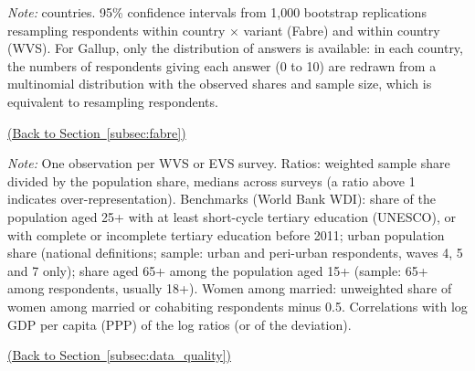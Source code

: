 \documentclass[11pt]{article}
\providecommand{\backlink}[2]{\if\relax\detokenize{#2}\relax\else\hfill\hyperref[#2]{(Back to Section~\ref*{#2})}\fi}
\begin{document}
\begin{table}[p]
    \centering
    \caption{Decomposition of the WVS--Gallup gap: summary.}\label{tab:decomposition_summary}
    \begin{adjustbox}{max width=\textwidth}
    
    \end{adjustbox}
    \begin{minipage}{\textwidth}\footnotesize \textit{Note:} \nDecompCountries countries. 95\% confidence intervals from 1,000 bootstrap replications resampling respondents within country $\times$ variant (Fabre) and within country (WVS). For Gallup, only the distribution of answers is available: in each country, the numbers of respondents giving each answer (0 to 10) are redrawn from a multinomial distribution with the observed shares and sample size, which is equivalent to resampling respondents.\end{minipage}
    {\footnotesize\backlink{tab:decomposition_summary}{subsec:fabre}\par}
\end{table}

\begin{table}[p]
    \centering
    \caption{Representativeness of WVS/EVS samples: sample shares relative to population benchmarks.}\label{tab:representativeness}
    \begin{adjustbox}{max width=\textwidth}
    
    \end{adjustbox}
    \begin{minipage}{\textwidth}\footnotesize \textit{Note:} One observation per WVS or EVS survey. Ratios: weighted sample share divided by the population share, medians across surveys (a ratio above 1 indicates over-representation). Benchmarks (World Bank WDI): share of the population aged 25+ with at least short-cycle tertiary education (UNESCO), or with complete or incomplete tertiary education \citep{barro_new_2013} before 2011; urban population share (national definitions; sample: urban and peri-urban respondents, waves 4, 5 and 7 only); share aged 65+ among the population aged 15+ (sample: 65+ among respondents, usually 18+). Women among married: unweighted share of women among married or cohabiting respondents minus 0.5. Correlations with log GDP per capita (PPP) of the log ratios (or of the deviation).\end{minipage}
    {\footnotesize\backlink{tab:representativeness}{subsec:data_quality}\par}
\end{table}
\end{document}
